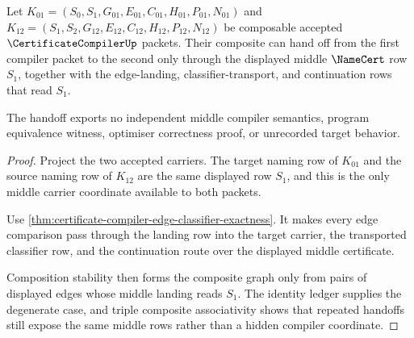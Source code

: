 \begin{theorem}
\label{thm:certificate-compiler-middle-row-handoff}
Let $K_{01}=(S_0,S_1,G_{01},E_{01},C_{01},H_{01},P_{01},N_{01})$ and $K_{12}=(S_1,S_2,G_{12},E_{12},C_{12},H_{12},P_{12},N_{12})$ be composable accepted $\CertificateCompilerUp$ packets. Their composite can hand off from the first compiler packet to the second only through the displayed middle $\NameCert$ row $S_1$, together with the edge-landing, classifier-transport, and continuation rows that read $S_1$.

The handoff exports no independent middle compiler semantics, program equivalence witness, optimiser correctness proof, or unrecorded target behavior.
\end{theorem}
\begin{proof}
Project the two accepted carriers. The target naming row of $K_{01}$ and the source naming row of $K_{12}$ are the same displayed row $S_1$, and this is the only middle carrier coordinate available to both packets.

Use \autoref{thm:certificate-compiler-edge-classifier-exactness}. It makes every edge comparison pass through the landing row into the target carrier, the transported classifier row, and the continuation route over the displayed middle certificate.

Composition stability then forms the composite graph only from pairs of displayed edges whose middle landing reads $S_1$. The identity ledger supplies the degenerate case, and triple composite associativity shows that repeated handoffs still expose the same middle rows rather than a hidden compiler coordinate.
\end{proof}

